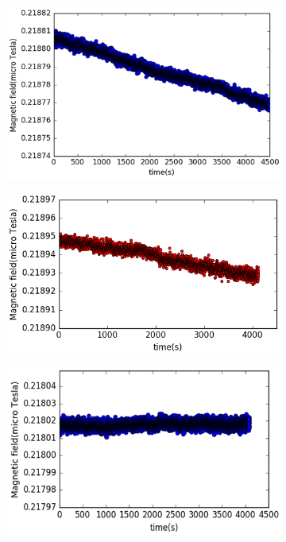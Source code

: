 \begin{figure}
  \centering
  \begin{subfigure}[b]{0.45\textwidth}
    \centering
    \includegraphics[width=\textwidth]{figures/before_degaussing}
    \caption{}
    \label{fig:without DG}
  \end{subfigure}
  \hfill
  \begin{subfigure}[b]{0.47\textwidth}
    \centering
    \includegraphics[width=\textwidth]{figures/innermost_degaussing.png}
    \caption{}
    \label{fig:with_DG_innermost}
  \end{subfigure}
  \begin{subfigure}[b]{0.45\textwidth}
    \centering
    \includegraphics[width=\textwidth]{figures/after_degaussing}

\end{subfigure}
\end{figure}
